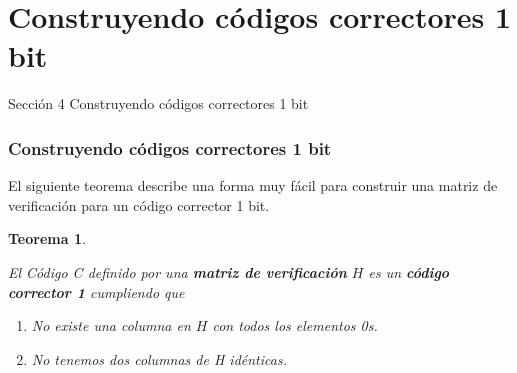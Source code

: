\documentclass{beamer}
\theoremstyle{plain}
\newtheorem{teorema} [Teorema] {Teorema}
\theoremstyle{example}
\newtheorem{ejercicio} [Ejercicio]{Ejercicio}
\theoremstyle{example}
\begin{document}










\section{Construyendo códigos correctores 1 bit}

\begin{frame}   \footnotesize
{
\begin{block}{Sección 4}
Construyendo códigos correctores 1 bit
\end{block}
}
\end{frame} 
\begin{frame}  \frametitle{Construyendo códigos correctores 1 bit} \small  
El siguiente teorema describe una forma muy fácil para construir una matriz de verificación para un código corrector 1 bit.

\begin{teorema}\label{teo:Hdef}

El Código C definido por una \textbf{matriz de verificación} $H$ es un \textbf{código corrector 1} cumpliendo que 

\begin{enumerate}
\item No existe una columna en $H$ con todos los elementos 0s.
\item No tenemos dos columnas de H idénticas.
\end{enumerate}

\end{teorema}

\end{frame} 
\end{document}

